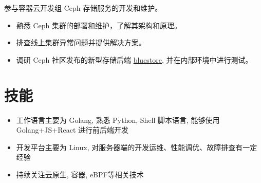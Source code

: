 \documentclass{resume}
\begin{document}
参与容器云开发组 Ceph 存储服务的开发和维护。
\begin{itemize}[parsep=0.5ex]
  \item 熟悉 Ceph 集群的部署和维护，了解其架构和原理。
  \item 排查线上集群异常问题并提供解决方案。
  \item 调研 Ceph 社区发布的新型存储后端 \href{https://ceph.io/en/news/blog/2017/new-luminous-bluestore/}{bluestore}, 并在内部环境中进行测试。
\end{itemize}


\section{技能}
\begin{itemize}[parsep=0.5ex]
  \item 工作语言主要为 Golang, 熟悉 Python, Shell 脚本语言, 能够使用 Golang+JS+React 进行前后端开发
  \item 开发平台主要为 Linux, 对服务器端的开发运维、性能调优、故障排查有一定经验
  \item 持续关注云原生, 容器, eBPF等相关技术
\end{itemize}
\end{document}
